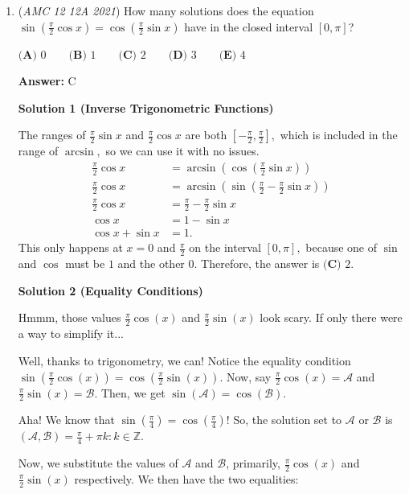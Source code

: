 \begin{enumerate}
 


	\item (\textit{AMC 12 12A 2021}) How many solutions does the equation $\sin \left( \frac{\pi}2 \cos x\right)=\cos \left( \frac{\pi}2 \sin x\right)$ have in the closed interval $[0,\pi]$?


 $\textbf{(A) }0 \qquad \textbf{(B) }1 \qquad \textbf{(C) }2 \qquad \textbf{(D) }3\qquad \textbf{(E) }4$

 \textbf{Answer: }C



\textbf{Solution 1 (Inverse Trigonometric Functions)}

The ranges of $\frac{\pi}2 \sin x$ and $\frac{\pi}2 \cos x$ are both $\left[-\frac{\pi}2, \frac{\pi}2 \right],$ which is included in the range of $\arcsin,$ so we can use it with no issues.
 \begin{align*} \frac{\pi}2 \cos x &= \arcsin \left( \cos \left( \frac{\pi}2 \sin x\right)\right) \\ \frac{\pi}2 \cos x &= \arcsin \left( \sin \left( \frac{\pi}2 - \frac{\pi}2 \sin x\right)\right) \\ \frac{\pi}2 \cos x &= \frac{\pi}2 - \frac{\pi}2 \sin x \\ \cos x &= 1 - \sin x \\ \cos x + \sin x &= 1. \end{align*}
This only happens at $x = 0$ and $\frac{\pi}2$ on the interval $[0,\pi],$ because one of $\sin$ and $\cos$ must be $1$ and the other $0.$ Therefore, the answer is $\boxed{\textbf{(C) }2}.$




\textbf{Solution 2 (Equality Conditions)}

Hmmm, those values $\frac{\pi}{2} \cos(x)$ and $\frac{\pi}{2} \sin(x)$ look scary. If only there were a way to simplify it...

 Well, thanks to trigonometry, we can! Notice the equality condition $\sin\left(\frac{\pi}{2}\cos(x)\right) = \cos\left(\frac{\pi}{2}\sin(x)\right)$. Now, say $\frac{\pi}{2} \cos(x) = \mathcal{A}$ and $\frac{\pi}{2} \sin(x) = \mathcal{B}$. Then, we get $\sin(\mathcal{A}) = \cos({\mathcal{B}})$.

 Aha! We know that $\sin\left(\frac{\pi}{4}\right) = \cos\left(\frac{\pi}{4}\right)$! So, the solution set to $\mathcal{A}$ or $\mathcal{B}$ is $(\mathcal{A},\mathcal{B}) = \frac{\pi}{4} + \pi k : k \in \mathbb{Z}$.

 Now, we substitute the values of $\mathcal{A}$ and $\mathcal{B}$, primarily, $\frac{\pi}{2} \cos(x)$ and $\frac{\pi}{2} \sin(x)$ respectively. We then have the two equalities:


\end{enumerate}
